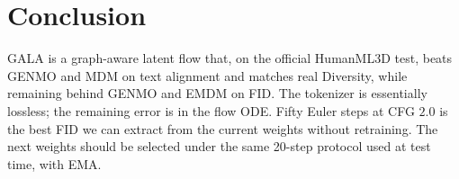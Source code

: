 \documentclass[10pt,twocolumn]{article}
\begin{document}
\section{Conclusion}

GALA is a graph-aware latent flow that, on the official HumanML3D test, beats GENMO and MDM on text alignment and matches real Diversity, while remaining behind GENMO and EMDM on FID.
The tokenizer is essentially lossless; the remaining error is in the flow ODE.
Fifty Euler steps at CFG $2.0$ is the best FID we can extract from the current weights without retraining.
The next weights should be selected under the same 20-step protocol used at test time, with EMA.



\end{document}
